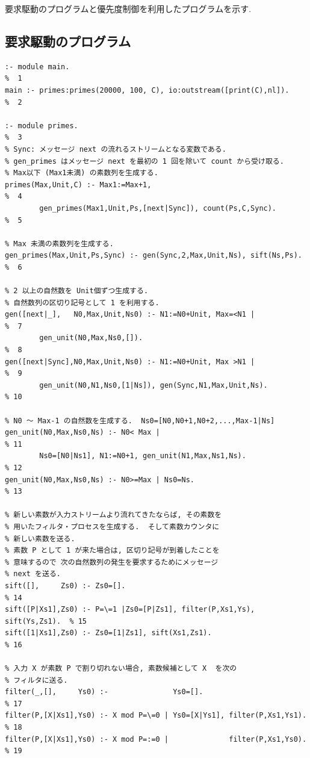 \documentclass[a4,titlepage]{jsreport}
\begin{document}
要求駆動のプログラムと優先度制御を利用したプログラムを示す.  

\subsection*{要求駆動のプログラム}

\begin{Verbatim}[baselinestretch=0.8]
:- module main.                                                           %  1
main :- primes:primes(20000, 100, C), io:outstream([print(C),nl]).        %  2

:- module primes.                                                         %  3
% Sync: メッセージ next の流れるストリームとなる変数である.
% gen_primes はメッセージ next を最初の 1 回を除いて count から受け取る.
% Max以下 (Max1未満) の素数列を生成する. 
primes(Max,Unit,C) :- Max1:=Max+1,                                        %  4
        gen_primes(Max1,Unit,Ps,[next|Sync]), count(Ps,C,Sync).           %  5

% Max 未満の素数列を生成する.
gen_primes(Max,Unit,Ps,Sync) :- gen(Sync,2,Max,Unit,Ns), sift(Ns,Ps).     %  6

% 2 以上の自然数を Unit個ずつ生成する.
% 自然数列の区切り記号として 1 を利用する.
gen([next|_],   N0,Max,Unit,Ns0) :- N1:=N0+Unit, Max=<N1 |                %  7
        gen_unit(N0,Max,Ns0,[]).                                          %  8
gen([next|Sync],N0,Max,Unit,Ns0) :- N1:=N0+Unit, Max >N1 |                %  9
        gen_unit(N0,N1,Ns0,[1|Ns]), gen(Sync,N1,Max,Unit,Ns).             % 10

% N0 〜 Max-1 の自然数を生成する.  Ns0=[N0,N0+1,N0+2,...,Max-1|Ns]
gen_unit(N0,Max,Ns0,Ns) :- N0< Max |                                      % 11
        Ns0=[N0|Ns1], N1:=N0+1, gen_unit(N1,Max,Ns1,Ns).                  % 12
gen_unit(N0,Max,Ns0,Ns) :- N0>=Max | Ns0=Ns.                              % 13

% 新しい素数が入力ストリームより流れてきたならば, その素数を
% 用いたフィルタ・プロセスを生成する.  そして素数カウンタに
% 新しい素数を送る.
% 素数 P として 1 が来た場合は, 区切り記号が到着したことを
% 意味するので 次の自然数列の発生を要求するためにメッセージ
% next を送る.
sift([],     Zs0) :- Zs0=[].                                              % 14
sift([P|Xs1],Zs0) :- P=\=1 |Zs0=[P|Zs1], filter(P,Xs1,Ys), sift(Ys,Zs1).  % 15
sift([1|Xs1],Zs0) :- Zs0=[1|Zs1], sift(Xs1,Zs1).                          % 16

% 入力 X が素数 P で割り切れない場合, 素数候補として X  を次の
% フィルタに送る.
filter(_,[],     Ys0) :-               Ys0=[].                            % 17
filter(P,[X|Xs1],Ys0) :- X mod P=\=0 | Ys0=[X|Ys1], filter(P,Xs1,Ys1).    % 18
filter(P,[X|Xs1],Ys0) :- X mod P=:=0 |              filter(P,Xs1,Ys0).    % 19


\end{Verbatim}
\end{document}
